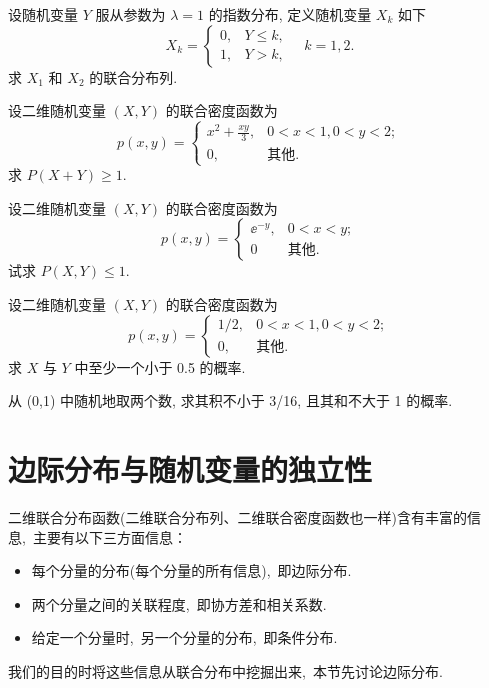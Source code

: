 \begin{xiti}
\begin{enumerate}[(1)]
	 	\end{enumerate}
	 	\item 设随机变量 $Y$ 服从参数为 $\lambda=1$ 的指数分布, 定义随机变量 $X_k$ 如下
	 	\[
	 	 	X_k=\begin{cases}
	 	 		0,&		Y\leq k, \\
	 	 		1,&		Y>k,
	 	 	\end{cases} \quad k=1,2.
	 	\]
	 	求 $X_1$ 和 $X_2$ 的联合分布列.
	 	\item 设二维随机变量 $(X,Y)$ 的联合密度函数为
	 	\[
	 	 	p(x,y)=\begin{cases}
	 	 		x^2+\frac{xy}{3},&	0<x<1,0<y<2;\\
	 	 		0,		&			\text{其他} .
	 	 	\end{cases}
	 	\]
	 	求 $P(X+Y)\geq 1$.
	 	\item 设二维随机变量 $(X,Y)$ 的联合密度函数为
	 	\[
	 	 	p(x,y)=\begin{cases}
	 	 		\ee^{-y},	&	0<x<y;\\
	 	 		0&			\text{其他} .
	 	 	\end{cases}
	 	\]
	 	试求 $P(X,Y)\leq 1$.
	 	\item 设二维随机变量 $(X,Y)$ 的联合密度函数为
	 	\[
	 	 	p(x,y)=\begin{cases}
	 	 		1/2,&	0<x<1,0<y<2;\\
	 	 		0,&		\text{其他} .	
	 	 	\end{cases}
	 	\]
	 	求 $X$ 与 $Y$ 中至少一个小于 0.5 的概率.
	 	\item 从 (0,1) 中随机地取两个数, 求其积不小于 3/16, 且其和不大于 1 的概率.
	 \end{xiti}

	\section{边际分布与随机变量的独立性}\label{sec:3.2}
  二维联合分布函数(二维联合分布列、二维联合密度函数也一样)含有丰富的信息,\ 主要有以下三方面信息：
  \begin{itemize}
  	\item 每个分量的分布(每个分量的所有信息),\ 即边际分布.
  	\item 两个分量之间的关联程度,\ 即协方差和相关系数.
  	\item 给定一个分量时,\ 另一个分量的分布,\ 即条件分布.
  \end{itemize}
  我们的目的时将这些信息从联合分布中挖掘出来,\ 本节先讨论边际分布.
  
